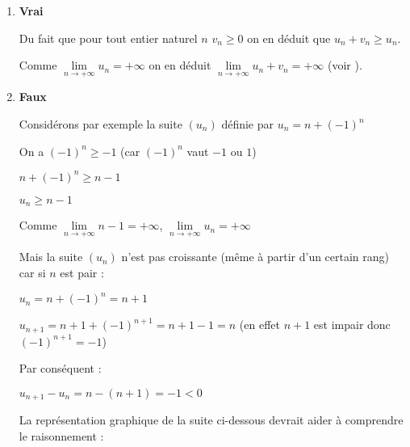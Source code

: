 \begin{corrige}
     \begin{enumerate}
          \item
          \textbf{Vrai}
\par
          Du fait que pour tout entier naturel $n$ $v_{n} \geqslant 0$ on en déduit que $u_{n}+v_{n} \geqslant  u_{n}$.
          \par
          Comme $\lim\limits_{n\rightarrow +\infty }u_{n}=+\infty $ on en déduit $\lim\limits_{n\rightarrow +\infty }u_{n}+v_{n}=+\infty $ (voir ).
          \item
          \textbf{Faux}
\par
          Considérons par exemple la suite $\left(u_{n}\right)$ définie par $u_{n}=n+\left(-1\right)^{n}$
          \par
          On a $\left(-1\right)^{n} \geqslant  -1$ (car $\left(-1\right)^{n}$ vaut $-1$ ou $1$)
          \par
          $n+\left(-1\right)^{n} \geqslant  n-1$
          \par
          $u_{n} \geqslant  n-1$
          \par
          Comme $\lim\limits_{n\rightarrow +\infty }n-1=+\infty $, $\lim\limits_{n\rightarrow +\infty }u_{n}=+\infty $
          \par
          Mais la suite $\left(u_{n}\right)$ n'est pas croissante (même à partir d'un certain rang) car si $n$ est pair :
          \par
          $u_{n}=n+\left(-1\right)^{n}=n+1$
          \par
          $u_{n+1}=n+1+\left(-1\right)^{n+1}=n+1-1=n$ (en effet $n+1$ est impair donc $\left(-1\right)^{n+1}=-1$)
          \par
          Par conséquent :
          \par
          $u_{n+1}-u_{n} =n-\left(n+1\right)=-1 < 0$
          \par
          La représentation graphique de la suite ci-dessous devrait aider à comprendre le raisonnement :


\end{enumerate}
\end{corrige}
